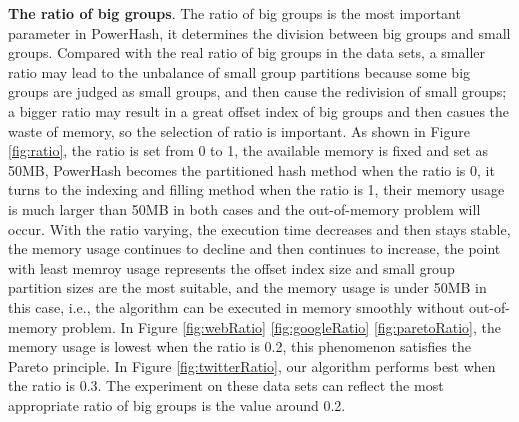 \textbf{The ratio of big groups}. The ratio of big groups is the most important parameter in PowerHash, it determines the division between big groups and small groups. Compared with the real ratio of big groups in the data sets, a smaller ratio may lead to the unbalance of small group partitions because some big groups are judged as small groups, and then cause the redivision of small groups; a bigger ratio may result in a great offset index of big groups and then casues the waste of memory, so the selection of ratio is important. As shown in Figure \ref{fig:ratio}, the ratio is set from 0 to 1, the available memory is fixed and set as 50MB, PowerHash becomes the partitioned hash method when the ratio is 0, it turns to the indexing and filling method when the ratio is 1, their memory usage is much larger than 50MB in both cases and the out-of-memory problem will occur. With the ratio varying, the execution time decreases and then stays stable, the memory usage continues to decline and then continues to increase, the point with least memroy usage represents the offset index size and small group partition sizes are the most suitable, and the memory usage is under 50MB in this case, i.e., the algorithm can be executed in memory smoothly without out-of-memory problem. In Figure \ref{fig:webRatio} \ref{fig:googleRatio} \ref{fig:paretoRatio}, the memory usage is lowest when the ratio is 0.2, this phenomenon satisfies the Pareto principle. In Figure \ref{fig:twitterRatio}, our algorithm performs best when the ratio is 0.3. The experiment on these data sets can reflect the most appropriate ratio of big groups is the value around 0.2.
 
